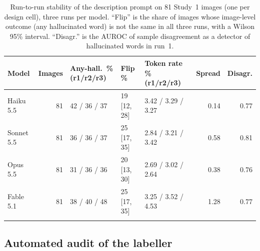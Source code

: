 \documentclass[pdflatex,sn-mathphys-num]{sn-jnl}%
\theoremstyle{thmstyleone}%
\theoremstyle{thmstyletwo}%
\theoremstyle{thmstylethree}%
\newcommand{\StabN}{81}
\begin{document}
\begin{table}[!htbp]
\caption{Run-to-run stability of the description prompt on \StabN{} Study~1 images (one per design cell), three runs per model. ``Flip'' is the share of images whose image-level outcome (any hallucinated word) is not the same in all three runs, with a Wilson 95\% interval. ``Disagr.'' is the AUROC of sample disagreement as a detector of hallucinated words in run~1.}\label{tab:stab}
\footnotesize
\begin{tabular*}{\textwidth}{@{\extracolsep\fill}lrlllrr}
\toprule
Model & Images & Any-hall.\ \% (r1/r2/r3) & Flip \% & Token rate \% (r1/r2/r3) & Spread & Disagr. \\
\midrule
Haiku 5.5 & 81 & 42 / 36 / 37 & 19 [12, 28] & 3.42 / 3.29 / 3.27 & 0.14 & 0.77 \\
Sonnet 5.5 & 81 & 36 / 36 / 37 & 25 [17, 35] & 2.84 / 3.21 / 3.42 & 0.58 & 0.81 \\
Opus 5.5 & 81 & 31 / 36 / 36 & 20 [13, 30] & 2.69 / 3.02 / 2.64 & 0.38 & 0.76 \\
Fable 5.1 & 81 & 38 / 40 / 48 & 25 [17, 35] & 3.25 / 3.52 / 4.53 & 1.28 & 0.77 \\
\botrule
\end{tabular*}
\end{table}

\subsection{Automated audit of the labeller}\label{sec:audit_res}
\end{document}
